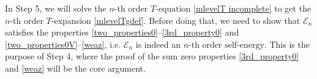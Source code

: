 \documentclass{article}
\newcommand{\1}{\mathds{1}}
\numberwithin{equation}{section}
\renewcommand{\leq}{\leqslant}
\renewcommand{\le}{\leq}
\newcommand{\self}{\text{self-energy}}
\theoremstyle{plain} %
\theoremstyle{remark}
\newcommand{\cob}{\color{purple}}
\newcommand{\Sele}{{\mathcal E}}
\newcommand{\incomp}{{\text{$T$-equation}}}
\begin{document}
In Step 5, we will solve the $n$-th order $\incomp$ \eqref{mlevelT incomplete} to get the $n$-th order $T$-expansion \eqref{mlevelTgdef}. Before doing that, we need to show that $\Sele_n$ satisfies the properties \eqref{two_properties0}--\eqref{3rd_property0} and \eqref{two_properties0V}--\eqref{weaz},  i.e. $\Sele_n$ is indeed an $n$-th order $\self$. This is the purpose of Step 4, where the proof of the sum zero properties \eqref{3rd_property0} and \eqref{weaz} will be the core argument. %




   
\end{document}
